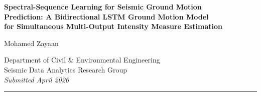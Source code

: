 \documentclass[12pt,a4paper]{article}
\begin{document}
\begin{titlepage}
\centering
\vspace*{1.5cm}

{\LARGE\bfseries\sffamily
Spectral-Sequence Learning for Seismic Ground Motion\\ Prediction:
A Bidirectional LSTM Ground Motion Model\\[0.4em]
for Simultaneous Multi-Output Intensity Measure Estimation
\par}

\vspace{1.2cm}
{\large Mohamed Zayaan\par}
\vspace{0.3cm}
{\normalsize
Department of Civil \& Environmental Engineering\\
Seismic Data Analytics Research Group\\[0.2em]
\textit{Submitted April 2026}
\par}

\vspace{1.5cm}
\noindent\rule{\textwidth}{1pt}


\end{titlepage}
\end{document}
